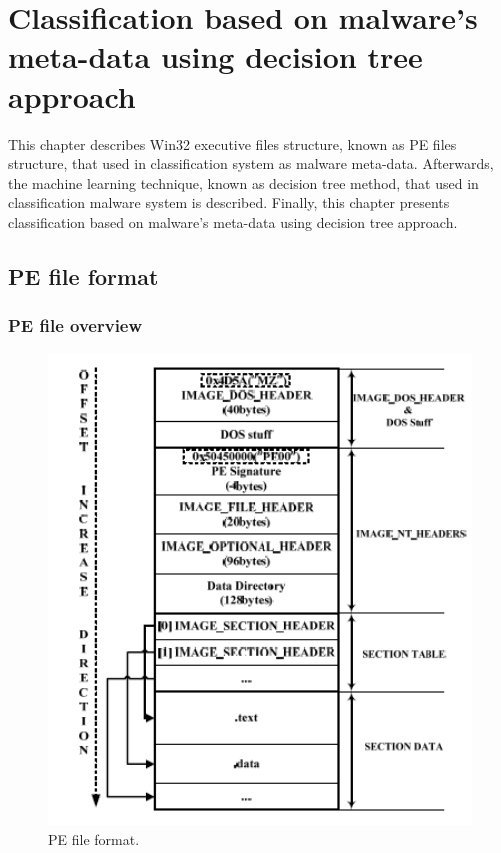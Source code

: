\chapter{Classification based on malware's meta-data using decision tree approach}\label{chap:4}
%
%
This chapter describes Win32 executive files structure, known as PE files structure, that used in classification system as malware meta-data. Afterwards, the machine learning technique, known as decision tree method, that used in classification malware system is described. Finally, this chapter presents classification based on malware's meta-data using decision tree approach. 
\section{PE file format}
\subsection{PE file overview}
\begin{figure}[h!]
\centering
\includegraphics[width=1\textwidth]{graph/pe1.png}
\caption{PE file format.}
\label{fig:pe1}
\end{figure}
